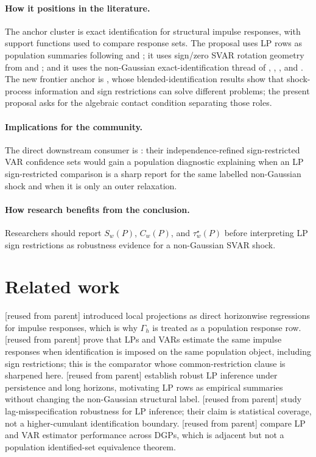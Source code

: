 \documentclass[11pt]{article}
\theoremstyle{definition}
\theoremstyle{plain}
\theoremstyle{remark}
\begin{document}
\paragraph{How it positions in the literature.}
The anchor cluster is exact identification for structural impulse responses, with support functions used to compare response sets.  The proposal uses LP rows as population summaries following \citet{Jorda2005} and \citet{PlagborgMollerWolf2021}; it uses sign/zero SVAR rotation geometry from \citet{AriasRubioRamirezWaggoner2018} and \citet{Read2022}; and it uses the non-Gaussian exact-identification thread of \citet{GourierouxMonfortRenne2017}, \citet{LanneMeitzSaikkonen2017}, \citet{Guay2021}, and \citet{LanneLiuLuoto2026}.  The new frontier anchor is \citet{CarrieroMarcellinoTornese2024}, whose blended-identification results show that shock-process information and sign restrictions can solve different problems; the present proposal asks for the algebraic contact condition separating those roles.

\paragraph{Implications for the community.}
The direct downstream consumer is \citet{DrautzburgWright2023}: their independence-refined sign-restricted VAR confidence sets would gain a population diagnostic explaining when an LP sign-restricted comparison is a sharp report for the same labelled non-Gaussian shock and when it is only an outer relaxation.

\paragraph{How research benefits from the conclusion.}
Researchers should report \(S_w(P)\), \(C_w(P)\), and \(\tau_w^\star(P)\) before interpreting LP sign restrictions as robustness evidence for a non-Gaussian SVAR shock.

\section{Related work}
\citet{Jorda2005} [reused from parent] introduced local projections as direct horizonwise regressions for impulse responses, which is why \(\Gamma_h\) is treated as a population response row.  \citet{PlagborgMollerWolf2021} [reused from parent] prove that LPs and VARs estimate the same impulse responses when identification is imposed on the same population object, including sign restrictions; this is the comparator whose common-restriction clause is sharpened here.  \citet{MontielOleaPlagborgMoller2021} [reused from parent] establish robust LP inference under persistence and long horizons, motivating LP rows as empirical summaries without changing the non-Gaussian structural label.  \citet{MontielOleaPlagborgMollerQianWolf2024} [reused from parent] study lag-misspecification robustness for LP inference; their claim is statistical coverage, not a higher-cumulant identification boundary.  \citet{LiPlagborgMollerWolf2024} [reused from parent] compare LP and VAR estimator performance across DGPs, which is adjacent but not a population identified-set equivalence theorem.
\end{document}

